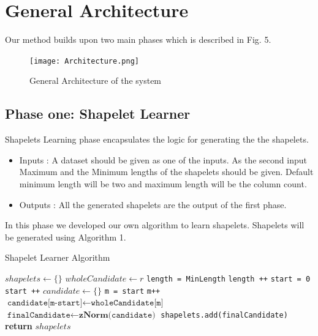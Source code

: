 \documentclass[letterpaper, 10 pt, conference]{IEEEtran}  %
\begin{document}
\section{General Architecture}
Our method builds upon two main phases which is described in Fig. 5.
\begin{figure}[h!]
\texttt{[image: Architecture.png]}
\caption{General Architecture of the system}
\end{figure}

\subsection{Phase one: Shapelet Learner}
Shapelets Learning phase encapsulates the logic for generating the the shapelets.
\begin{itemize}
\item Inputs : A dataset should be given as one of the inputs. As the second input Maximum and the Minimum lengths of the shapelets should be given. Default minimum length will be two and maximum length will be the column count.
\item Outputs : All the generated shapelets are the output of the first phase.
\end{itemize}
In this phase we developed our own algorithm to learn shapelets. Shapelets will be generated using Algorithm 1.

\begin{algorithm}[H]
  \caption{Shapelet Learner Algorithm}\label{shapeletLearner}
  \begin{algorithmic}[1]
     \State $shapelets \gets \{\}$
      	\State $wholeCandidate \gets r$
        \State \texttt{length = MinLength}
        \State \texttt{length ++}
        \State \texttt{start = 0}
            \State \texttt{start ++}
            \State $candidate \gets \{\}$
            \State \texttt{m = start}
                	\State \texttt{m++}
                    \State $\texttt{candidate[m-start]}\gets \texttt{wholeCandidate[m]}$
                \EndWhile
                \State $\texttt{finalCandidate} \gets \textbf{zNorm(}\texttt{candidate}\textbf{)}$
                \State \texttt{shapelets.add(finalCandidate)}
            \EndWhile
        \EndWhile
      \EndFor
      \State \textbf{return} $shapelets$
    \EndProcedure
  \end{algorithmic}
\end{algorithm}
\end{document}
